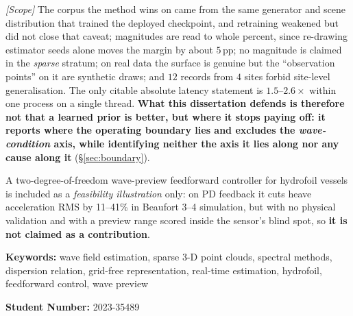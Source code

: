 \documentclass[11pt]{report}
\numberwithin{equation}{chapter}
\numberwithin{figure}{chapter}
\numberwithin{table}{chapter}
\begin{document}
\emph{[Scope]} The corpus the method wins on came from the same generator and scene
distribution that trained the deployed checkpoint, and retraining weakened but did not
close that caveat; magnitudes are read to whole percent, since re-drawing estimator
seeds alone moves the margin by about $5$\,pp; no magnitude is claimed in the
\emph{sparse} stratum; on real data the surface is genuine but the ``observation
points'' on it are synthetic draws; and $12$ records from $4$ sites forbid site-level
generalisation. The only citable absolute latency statement is
$1.5$--$2.6\times$ within one process on a single thread. \textbf{What this dissertation
defends is therefore not that a learned prior is better, but where it stops paying off:
it reports where the operating boundary lies and excludes the \emph{wave-condition}
axis, while identifying neither the axis it lies along nor any cause along it}
(\S\ref{sec:boundary}).

A two-degree-of-freedom wave-preview feedforward controller for hydrofoil vessels is
included as a \emph{feasibility illustration} only: on PD feedback it cuts heave
acceleration RMS by 11--41\% in Beaufort 3--4 simulation, but with no physical
validation and with a preview range scored inside the sensor's blind spot, so
\textbf{it is not claimed as a contribution}.

\vspace{1em}
\noindent\textbf{Keywords:} wave field estimation, sparse 3-D point clouds, spectral
methods, dispersion relation, grid-free representation, real-time estimation,
hydrofoil, feedforward control, wave preview

\noindent\textbf{Student Number:} 2023-35489

\newpage
\tableofcontents

\newpage
\listoffigures

\newpage
\listoftables

\newpage
{}
\setcounter{page}{1}

\end{document}
